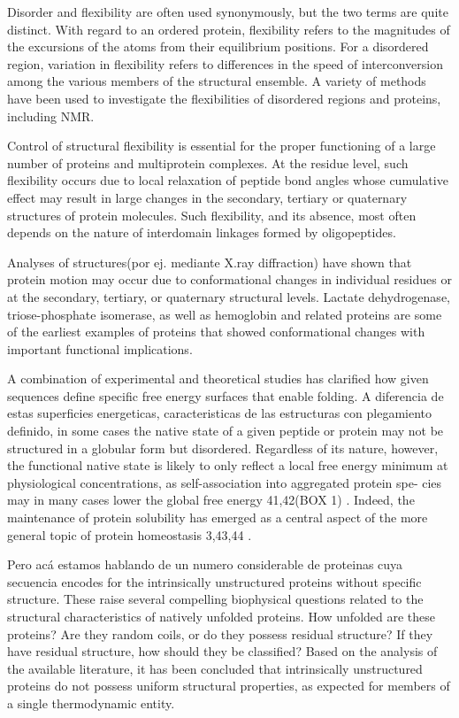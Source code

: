 Disorder and flexibility are often used synonymously, but the two terms are quite distinct\cite{radivojac2004protein}. With regard to an ordered protein, flexibility refers to the magnitudes of the excursions of the atoms from their equilibrium positions.
For a disordered region, variation in flexibility refers to differences in the speed of interconversion among the various members of the structural ensemble. 
A variety of methods have been used to investigate the flexibilities of disordered regions and proteins, including NMR.

Control of structural flexibility is essential for the proper functioning of a large number of proteins and multiprotein complexes. 
At the residue level, such flexibility occurs due to local relaxation of peptide bond angles whose cumulative effect may result in large changes in the secondary, tertiary or quaternary structures of protein molecules. 
Such flexibility, and its absence, most often depends on the nature of interdomain linkages formed by oligopeptides.

Analyses of structures(por ej. mediante X.ray diffraction) have shown that protein motion may occur due to conformational changes in individual residues or at the secondary, tertiary, or quaternary structural levels. Lactate dehydrogenase, triose-phosphate isomerase, as well as hemoglobin and related proteins are some of the earliest examples of proteins that showed conformational changes with important functional implications.




A combination of experimental and theoretical studies has clarified how given sequences define specific free energy surfaces that enable folding.
A diferencia de estas superficies energeticas, caracteristicas de las estructuras con plegamiento definido, in some cases the native state of a given peptide or protein may not be structured in a globular form but disordered.
Regardless of its nature, however, the functional native state is likely to only reflect a local free energy minimum at physiological concentrations, as self-association into aggregated protein spe-
cies may in many cases lower the global free energy 41,42(BOX 1) . Indeed, the maintenance of protein solubility has emerged as a central aspect of the more general topic of protein homeostasis 3,43,44 .

Pero acá estamos hablando de un numero considerable de proteinas cuya secuencia encodes for the intrinsically unstructured proteins without specific structure.
These raise several compelling biophysical questions related to the structural characteristics of natively unfolded proteins. How unfolded are these proteins? Are they random coils, or do
they possess residual structure? If they have residual structure, how should they be classified?
Based on the analysis of the available literature, it has been concluded that intrinsically unstructured proteins do not possess uniform structural properties, as expected for members of a single thermodynamic entity.


